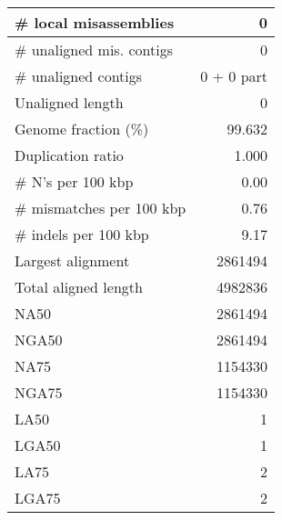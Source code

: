 \documentclass[12pt,a4paper]{article}
\begin{document}
\begin{table}[ht]
\begin{center}
\begin{tabular}{|l*{1}{|r}|}
\# local misassemblies & 0 \\ \hline
\# unaligned mis. contigs & 0 \\ \hline
\# unaligned contigs & 0 + 0 part \\ \hline
Unaligned length & 0 \\ \hline
Genome fraction (\%) & 99.632 \\ \hline
Duplication ratio & 1.000 \\ \hline
\# N's per 100 kbp & 0.00 \\ \hline
\# mismatches per 100 kbp & 0.76 \\ \hline
\# indels per 100 kbp & 9.17 \\ \hline
Largest alignment & 2861494 \\ \hline
Total aligned length & 4982836 \\ \hline
NA50 & 2861494 \\ \hline
NGA50 & 2861494 \\ \hline
NA75 & 1154330 \\ \hline
NGA75 & 1154330 \\ \hline
LA50 & 1 \\ \hline
LGA50 & 1 \\ \hline
LA75 & 2 \\ \hline
LGA75 & 2 \\ \hline
\end{tabular}
\end{center}
\end{table}
\end{document}
